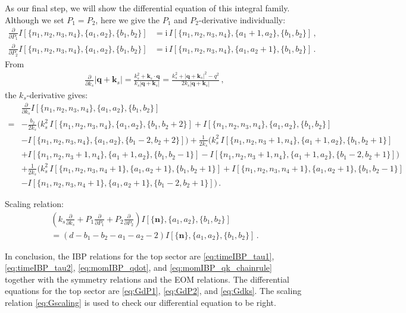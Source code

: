 \documentclass[%
 reprint,
 amsmath,amssymb,
 aps,
prd,
]{revtex4-2}
\newcommand{\n}{\nonumber}
\def\ie{\begin{equation}\begin{aligned}}
\def\fe{\end{aligned}\end{equation}}
\def\ii{\mathrm{i}}
\begin{document}
\begin{widetext}
As our final step, we will show the differential equation of this integral family. Although we set $P_1=P_2$, here we give the $P_1$ and $P_2$-derivative individually:
\begin{align}
	\frac{\partial}{\partial P_1}I[\{n_1,n_2,n_3,n_4\},\{a_1,a_2\},\{b_1,b_2\}] &= \ii\,I[\{n_1,n_2,n_3,n_4\},\{a_1+1,a_2\},\{b_1,b_2\}]\,, \label{eq:GdP1}\\
	\frac{\partial}{\partial P_2}I[\{n_1,n_2,n_3,n_4\},\{a_1,a_2\},\{b_1,b_2\}] &= \ii\,I[\{n_1,n_2,n_3,n_4\},\{a_1,a_2+1\},\{b_1,b_2\}]\,. \label{eq:GdP2}
\end{align}
From
\begin{align}
	\frac{\partial}{\partial k_s}|\bm q+\bm k_s|
	=\frac{k_s^2+\bm k_s\cdot \bm q}{k_s|\bm q+\bm k_s|}
	=\frac{k_s^2+|\bm q+\bm k_s|^2-q^2}{2k_s|\bm q+\bm k_s|}\,,
\end{align}
the $k_s$-derivative gives:
\ie
	&\frac{\partial}{\partial k_s}I[\{n_1,n_2,n_3,n_4\},\{a_1,a_2\},\{b_1,b_2\}] \\
	=&-\frac{b_2}{2k_s}\Big(
	k_s^2\,I[\{n_1,n_2,n_3,n_4\},\{a_1,a_2\},\{b_1,b_2+2\}]
	+I[\{n_1,n_2,n_3,n_4\},\{a_1,a_2\},\{b_1,b_2\}] \\
	&
	-I[\{n_1,n_2,n_3,n_4\},\{a_1,a_2\},\{b_1-2,b_2+2\}]
	\Big)+\frac{1}{2k_s}\Big(
	k_s^2\,I[\{n_1,n_2,n_3+1,n_4\},\{a_1+1,a_2\},\{b_1,b_2+1\}] \\
	&
	+I[\{n_1,n_2,n_3+1,n_4\},\{a_1+1,a_2\},\{b_1,b_2-1\}]
	-I[\{n_1,n_2,n_3+1,n_4\},\{a_1+1,a_2\},\{b_1-2,b_2+1\}]
	\Big) \\
	&+\frac{1}{2k_s}\Big(
	k_s^2\,I[\{n_1,n_2,n_3,n_4+1\},\{a_1,a_2+1\},\{b_1,b_2+1\}]
	+I[\{n_1,n_2,n_3,n_4+1\},\{a_1,a_2+1\},\{b_1,b_2-1\}] \\
	&
	-I[\{n_1,n_2,n_3,n_4+1\},\{a_1,a_2+1\},\{b_1-2,b_2+1\}]
	\Big)\,. \label{eq:Gdks}
\fe

Scaling relation:
\begin{align}
	\left( k_s \frac{\partial}{\partial k_s} + P_1 \frac{\partial}{\partial P_1} + P_2 \frac{\partial}{\partial P_2} \right) I[\{\bm n\},\{a_1,a_2\},\{b_1,b_2\}] \n\\
	= (d - b_1 - b_2 - a_1 - a_2 - 2) I[\{\bm n\},\{a_1,a_2\},\{b_1,b_2\}]\,. \label{eq:Gscaling}
\end{align}

In conclusion, the IBP relations for the top sector are \eqref{eq:timeIBP_tau1}, \eqref{eq:timeIBP_tau2}, \eqref{eq:momIBP_qdot}, and \eqref{eq:momIBP_qk_chainrule} together with the symmetry relations and the EOM relations. The differential equations for the top sector are \eqref{eq:GdP1}, \eqref{eq:GdP2}, and \eqref{eq:Gdks}. The scaling relation \eqref{eq:Gscaling} is used to check our differential equation to be right.





\end{widetext}
\end{document}

